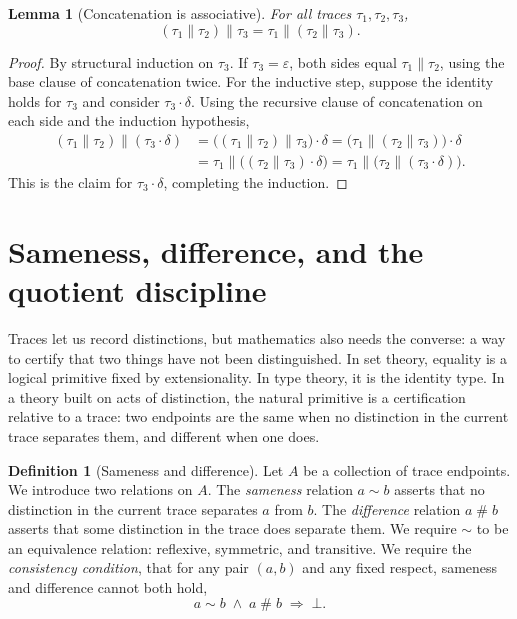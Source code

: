 \documentclass[11pt,a4paper]{article}
\newtheorem{lemma}[theorem]{Lemma}
\theoremstyle{definition}
\newtheorem{definition}[theorem]{Definition}
\theoremstyle{remark}
\begin{document}
\begin{lemma}[Concatenation is associative]\label{lem:concat}
For all traces $\tau_1, \tau_2, \tau_3$,
\[
  (\tau_1 \mathbin{\|} \tau_2) \mathbin{\|} \tau_3
  = \tau_1 \mathbin{\|} (\tau_2 \mathbin{\|} \tau_3).
\]
\end{lemma}

\begin{proof}
By structural induction on $\tau_3$. If $\tau_3 = \varepsilon$, both sides equal
$\tau_1 \mathbin{\|} \tau_2$, using the base clause of concatenation twice. For
the inductive step, suppose the identity holds for $\tau_3$ and consider
$\tau_3 \cdot \delta$. Using the recursive clause of concatenation on each side
and the induction hypothesis,
\begin{align*}
  (\tau_1 \mathbin{\|} \tau_2) \mathbin{\|} (\tau_3 \cdot \delta)
   &= \bigl( (\tau_1 \mathbin{\|} \tau_2) \mathbin{\|} \tau_3 \bigr) \cdot \delta
    = \bigl( \tau_1 \mathbin{\|} (\tau_2 \mathbin{\|} \tau_3) \bigr) \cdot \delta \\
   &= \tau_1 \mathbin{\|} \bigl( (\tau_2 \mathbin{\|} \tau_3) \cdot \delta \bigr)
    = \tau_1 \mathbin{\|} \bigl( \tau_2 \mathbin{\|} (\tau_3 \cdot \delta) \bigr).
\end{align*}
This is the claim for $\tau_3 \cdot \delta$, completing the induction.
\end{proof}

\section{Sameness, difference, and the quotient discipline}\label{sec:samediff}

Traces let us record distinctions, but mathematics also needs the converse: a
way to certify that two things have not been distinguished. In set theory,
equality is a logical primitive fixed by extensionality. In type theory, it is
the identity type. In a theory built on acts of distinction, the natural
primitive is a certification relative to a trace: two endpoints are the same
when no distinction in the current trace separates them, and different when one
does.

\begin{definition}[Sameness and difference]\label{def:samediff}
Let $A$ be a collection of trace endpoints. We introduce two relations on $A$.
The \emph{sameness} relation $a \sim b$ asserts that no distinction in the
current trace separates $a$ from $b$. The \emph{difference} relation
$a \mathbin{\#} b$ asserts that some distinction in the trace does separate them.
We require $\sim$ to be an equivalence relation: reflexive, symmetric, and
transitive. We require the \emph{consistency condition}, that for any pair
$(a,b)$ and any fixed respect, sameness and difference cannot both hold,
\[
  a \sim b \;\wedge\; a \mathbin{\#} b \;\Longrightarrow\; \bot .
\]
\end{definition}
\end{document}
